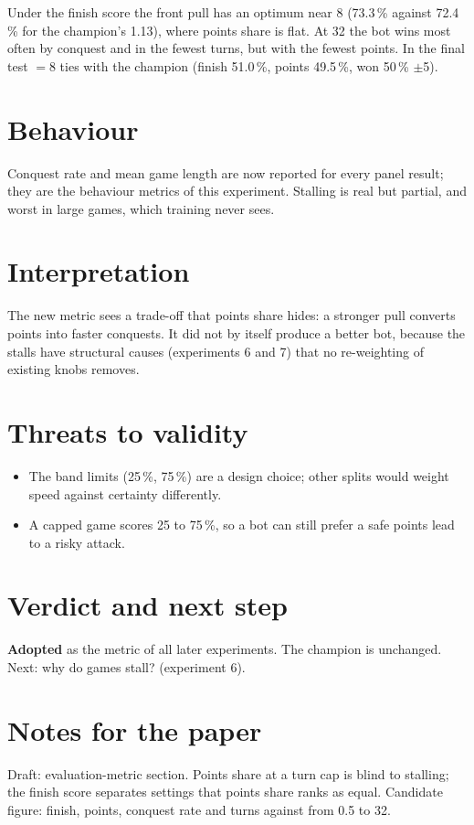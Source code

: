 \documentclass{../polyexp}
\begin{document}
\ExpResults

Under the finish score the front pull has an optimum near 8 (73.3\,\% against 72.4\,\% for the champion's 1.13), where points share is flat. At 32 the bot wins most often by conquest and in the fewest turns, but with the fewest points. In the final test  $=8$ ties with the champion (finish 51.0\,\%, points 49.5\,\%, won 50\,\% $\pm$5).

\section{Behaviour}
Conquest rate and mean game length are now reported for every panel result; they are the behaviour metrics of this experiment. Stalling is real but partial, and worst in large games, which training never sees.

\section{Interpretation}
The new metric sees a trade-off that points share hides: a stronger pull converts points into faster conquests. It did not by itself produce a better bot, because the stalls have structural causes (experiments 6 and 7) that no re-weighting of existing knobs removes.


\section{Threats to validity}
\begin{itemize}
\item The band limits (25\,\%, 75\,\%) are a design choice; other splits would weight speed against certainty differently.
\item A capped game scores 25 to 75\,\%, so a bot can still prefer a safe points lead to a risky attack.
\end{itemize}

\section{Verdict and next step}
\textbf{Adopted} as the metric of all later experiments. The champion is unchanged. Next: why do games stall? (experiment 6).

\section{Notes for the paper}
Draft: evaluation-metric section. Points share at a turn cap is blind to stalling; the finish score separates settings that points share ranks as equal. Candidate figure: finish, points, conquest rate and turns against  from 0.5 to 32.

\end{document}
